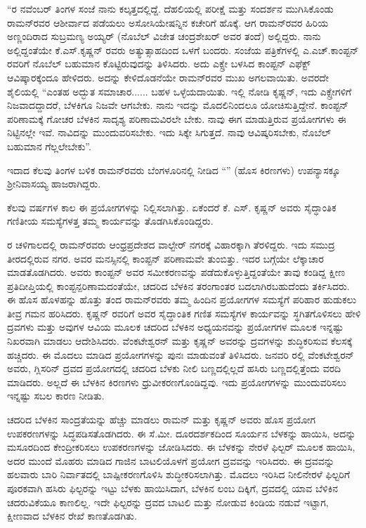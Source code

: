 “ರ ನವೆಂಬರ್ ತಿಂಗಳ ಸಂಜೆ ನಾನು ಕಲ್ಕತ್ತದಲ್ಲಿದ್ದೆ. ದೆಹಲಿಯಲ್ಲಿ ಪರೀಕ್ಷೆ ಮತ್ತು ಸಂದರ್ಶನ ಮುಗಿಸಿಕೊಂಡು ರಾಮನ್‍ರವರ ಆಶೀರ್ವಾದ ಪಡೆಯಲು ಅಸೋಸಿಯೇಷನ್ನಿನ ಕಚೇರಿಗೆ ಹೊಕ್ಕೆ. ಆಗ ರಾಮನ್‍ರವರ ಹಿರಿಯ ಅಣ್ಣಂದಿರಾದ ಸುಬ್ರಮಣ್ಯ ಅಯ್ಯರ್ (ನೊಬೆಲ್ ವಿಜೇತ ಚಂದ್ರಶೇಖರ್ ಅವರ ತಂದೆ) ಅಲ್ಲಿದ್ದರು. ನಾನು ಅಲ್ಲಿದ್ದಂತೆಯೇ ಕೆ.ಎಸ್.ಕೃಷ್ಣನ್ ರವರು ಅತ್ಯುತ್ಸಾಹದಿಂದ ಒಳಗೆ ಬಂದರು. ಸಂಜೆಯ ಪತ್ರಿಕೆಗಳಲ್ಲಿ ಎ.ಎಚ್.ಕಾಂಪ್ಟನ್ ರವರಿಗೆ ನೊಬೆಲ್ ಬಹುಮಾನ ಕೊಟ್ಟಿರುವುದನ್ನು ತಿಳಿಸಿದರು. ಅದು ಎಕ್ಸ್\enginline{-}ರೇ ಬಳಸಿದ ಕಾಂಪ್ಟನ್ ಎಫೆಕ್ಟ್ ಆವಿಷ್ಕಾರಕ್ಕೆಂದೂ ಹೇಳಿದರು. ಅದನ್ನು ಕೇಳಿದೊಡನೆಯೇ ರಾಮನ್‍ರವರ ಮುಖ ಅಗಲವಾಯಿತು. ಅವರದೇ ಶೈಲಿಯಲ್ಲಿ “ಎಂತಹ ಅದ್ಭುತ ಸಮಾಚಾರ...... ಬಹಳ ಒಳ್ಳೆಯದಾಯಿತು. ಇಲ್ಲಿ ನೋಡಿ ಕೃಷ್ಣನ್, ಇದು ಎಕ್ಸ್\enginline{-}ರೇಗಳಿಗೆ ನಿಜವಾದದ್ದಾದರೆ, ಬೆಳಕಿಗೂ ನಿಜವೇ ಆಗಬೇಕು. ನಾನು ಇದನ್ನು ಮೊದಲಿನಿಂದಲೂ ಯೋಚಿಸುತ್ತಿದ್ದೇನೆ. ಕಾಂಪ್ಟನ್ ಪರಿಣಾಮಕ್ಕೆ ಗೋಚರ ಬೆಳಕಿನ ಸಾದೃಶ್ಯ ಪರಿಣಾಮವಿರಲೇ ಬೇಕು. ನಾವು ಈಗ ಮಾಡುತ್ತಿರುವ ಪ್ರಯೋಗಗಳು ಈ ನಿಟ್ಟಿನಲ್ಲೇ ಇವೆ. ನಾವಿದನ್ನು ಮುಂದುವರಿಸಬೇಕು. ಇದು ಸಿಕ್ಕೇ ಸಿಗುತ್ತದೆ. ನಾವು ಆವಿಷ್ಕರಿಸಬೇಕು, ನೊಬೆಲ್ ಬಹುಮಾನ ಗೆಲ್ಲಲೇಬೇಕು”.

ಇದಾದ ಕೆಲವು ತಿಂಗಳ ಬಳಿಕ ರಾಮನ್‍ರವರು ಬೆಂಗಳೂರಿನಲ್ಲಿ ನೀಡಿದ “” (ಹೊಸ ಕಿರಣಗಳು) ಉಪನ್ಯಾಸಕ್ಕೂ ಶ‍್ರೀನಿವಾಸಯ್ಯ ಹಾಜರಾಗಿದ್ದರು.

ಕೆಲವು ವರ್ಷಗಳ ಕಾಲ ಈ ಪ್ರಯೋಗಗಳನ್ನು ನಿಲ್ಲಿಸಲಾಗಿತ್ತು. ಏಕೆಂದರೆ ಕೆ. ಎಸ್. ಕೃಷ್ಣನ್ ಅವರು ಸೈದ್ಧಾಂತಿಕ ಗಣಿತೀಯ ಸಮಸ್ಯೆಗಳತ್ತ ತಮ್ಮ ಕಾರ್ಯವನ್ನು ತೊಡಗಿಸಿಕೊಂಡಿದ್ದರು.

 ರ ಚಳಿಗಾಲದಲ್ಲಿ ರಾಮನ್‍ರವರು ಆಂಧ್ರಪ್ರದೇಶದ ವಾಲ್ಟೇರ್ ನಗರಕ್ಕೆ ವಿಹಾರಕ್ಕಾಗಿ ತೆರಳಿದ್ದರು. ಇದು ಸಮುದ್ರ ತೀರದಲ್ಲಿರುವ ನಗರ. ಅವರ ಮನಸ್ಸಿನಲ್ಲಿ ಕಾಂಪ್ಟನ್ ಪರಿಣಾಮವೇ ತುಂಬಿತ್ತು. ಇದರ ಬಗ್ಗೆಯೇ ಲೆಕ್ಕಾಚಾರ ಮಾಡತೊಡಗಿದರು. ಅವರು ಕಾಂಪ್ಟನ್ ಅವರ ಸಮೀ\-ಕರಣವನ್ನು ಪಡೆದುಕೊಳ್ಳುತ್ತಿದ್ದಂತೆಯೇ ತಾವು ಕಂಡಿದ್ದ ಕ್ಷೀಣ ಪ್ರತಿದೀಪ್ತಿಯಲ್ಲಿ ಕಾಂಪ್ಟನ್\break ಪರಿಣಾಮದಂತೆಯೇ, ಚದರಿದ ಬೆಳಕಿನ ತರಂಗಾಂತರ ಬದಲಾಗಿರಬಹುದೆಂದು ತರ್ಕಿಸಿದರು. ಈ ಹೊಸ ಹೊಳಹನ್ನು ಹೊತ್ತು ತಂದ ರಾಮನ್‍ರವರು ತಮ್ಮ ಹಿಂದಿನ ಪ್ರಯೋಗಗಳ ಸಮಸ್ಯೆಗೆ ಪರಿಹಾರ ಹುಡುಕಲು ತೀವ್ರ ಗಮನ ಹರಿಸಿದರು. ಕೃಷ್ಣನ್ ರವರಿಗೆ ಅವರ ಸೈದ್ಧಾಂತಿಕ ಗಣಿತ ಸಮಸ್ಯೆಗಳ ಕಾರ್ಯವನ್ನು ಸ್ಥಗಿತಗೊಳಿಸಲು ಹೇಳಿ ದ್ರವಗಳು ಮತ್ತು ಅವುಗಳ ಆವಿಯ ಮೂಲಕ ಚದರಿದ ಬೆಳಕಿನ ಅಧ್ಯಯನವನ್ನು ಪ್ರಯೋಗಗಳ ಮೂಲಕ ಇನ್ನಷ್ಟು ನಿಖರವಾಗಿ ಮಾಡಲು ಆದೇಶಿಸಿದರು. ವೆಂಕಟೇಶ್ವರನ್ ಮತ್ತು ಕೃಷ್ಣನ್ ಅವರನ್ನು ದ್ರವಗಳನ್ನು ಶುದ್ಧಿಕರಿಸುವ ಕೆಲಸಕ್ಕೆ ಹಚ್ಚಿದರು. ಈ ಮೊದಲು ಮಾಡಿದ ಪ್ರಯೋಗಗಳನ್ನು ಪುನಃ ಮಾಡುವಂತೆ ತಿಳಿಸಿದರು. ಜನವರಿ ರಲ್ಲಿ ವೆಂಕಟೇಶ್ವರನ್ ಅವರು, ಗ್ಲಿಸರಿನ್ ದ್ರವದ ಪ್ರಯೋಗದಲ್ಲಿ ಚದರಿದ ಬೆಳಕು ನೀಲಿ ಬಣ್ಣದಲ್ಲಿಲ್ಲದೆ ಹಸಿರು ಬಣ್ಣದಲ್ಲಿತ್ತೆಂದು ವರದಿ ಮಾಡಿದರು. ಅಲ್ಲದೆ ಈ ಬೆಳಕಿನ ಕಿರಣಗಳು ಧ್ರುವೀಕರಣಗೊಂಡಿದ್ದವು. ಇದು ಪ್ರಯೋಗಗಳನ್ನು ಮುಂದುವರಿಸಲು ಇನ್ನಷ್ಟು ಸಬಲ ಕಾರಣ ನೀಡಿತು.

\newpage

ಚದರಿದ ಬೆಳಕಿನ ಸಾಂದ್ರತೆಯನ್ನು ಹೆಚ್ಚು ಮಾಡಲು ರಾಮನ್ ಮತ್ತು ಕೃಷ್ಣನ್ ಅವರು ಹೊಸ ಪ್ರಯೋಗ ಉಪಕರಣಗಳನ್ನು ಸಿದ್ಧಪಡಿಸತೊಡಗಿದರು. ಈ ಸೆ.ಮೀ. ದೂರದರ್ಶಕದಿಂದ ಸೂರ್ಯನ ಬೆಳಕನ್ನು ಹಾಯಿಸಿ, ಅದನ್ನು ಮಸೂರದಿಂದ ಕೇಂದ್ರೀಕರಿಸಲು ಉಪಕರಣಗಳನ್ನು ಜೋಡಿಸಿದರು. ಈ ಬೆಳಕನ್ನು ನೇರಳೆ ಫಿಲ್ಟರ್ ಮೂಲಕ ಹಾಯಿಸಿ, ಅದರ ಮುಂದೆ ಮೊಹರು ಮಾಡಿದ ಗಾಜಿನ ಬಾಟಲಿಯೊಳಗೆ ಪ್ರಯೋಗ ದ್ರವವನ್ನು ಇರಿಸಿದರು. ಈ ದ್ರವವನ್ನು ಹಲವಾರು ಬಾರಿ ನಿರ್ವಾತದಲ್ಲಿ ಬಾಷ್ಪೀಕರಣಗೊಳಿಸಿ ಶುದ್ಧೀಕರಿಸಲಾಗಿತ್ತು. ಮೊದಲು ಇರಿಸಿದ ನೀಲಿ\enginline{-}ನೇರಳೆ ಫಿಲ್ಟರಿಗೆ ಪೂರಕವಾಗಿ ಹಸಿರು ಫಿಲ್ಟರನ್ನು ಇಟ್ಟು ಬೆಳಕು ಹಾಯಿಸಿದಾಗ, ಬೆಳಕಿನ ಲಂಬ ದಿಕ್ಕಿಗೆ, ದ್ರವದಲ್ಲಿ ಯಾವ ಬೆಳಿಕಿನ ಚದರುವಿಕೆಯೂ ಕಾಣಲಿಲ್ಲ. ಇದೇ ಫಿಲ್ಟರನ್ನು ದ್ರವದ ಬಾಟಲಿ ಮತ್ತು ನೋಡುವ ಕಿಂಡಿಯ ನಡುವೆ ಇಟ್ಟಾಗ, ಕ್ಷೀಣವಾದ ಬೆಳಕಿನ ರೇಖೆ ಕಾಣತೊಡಗಿತು.

